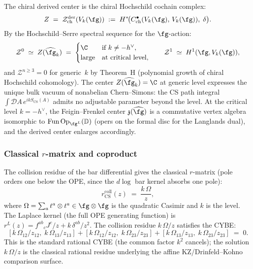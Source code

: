 The chiral derived center is the chiral Hochschild cochain
complex:
\begin{equation}\label{eq:cs-derived-center}
Z
\;=\;
\mathcal{Z}^{\mathrm{der}}_{\mathrm{ch}}(V_k(\fg))
\;:=\;
H^*\!\bigl(
 C^\bullet_{\mathrm{ch}}(V_k(\fg),\, V_k(\fg)),\;
 \delta
\bigr).
\end{equation}
By the Hochschild--Serre spectral sequence for the
$\fg$-action:
\begin{equation}\label{eq:cs-hochschild-computation}
\mathcal{Z}^0
\;\simeq\;
Z(\widehat{\fg}_k)
\;=\;
\begin{cases}
\C & \text{if } k \ne -h^\vee, \\
\text{large} & \text{at critical level},
\end{cases}
\qquad
\mathcal{Z}^1
\;\simeq\;
H^1(\fg, V_k(\fg)),
\end{equation}
and $\mathcal{Z}^{n \ge 3} = 0$ for generic~$k$ by Theorem~H (polynomial growth of chiral Hochschild cohomology). The center $Z(\widehat{\fg}_k) = \C$ at generic level expresses the unique bulk vacuum of nonabelian Chern--Simons: the CS path integral $\int \mathcal{D}A\, e^{ikS_{\mathrm{CS}}(A)}$ admits no adjustable parameter beyond the level. At the critical level $k = -h^\vee$, the Feigin--Frenkel center $\mathfrak{z}(\widehat{\fg})$ is a commutative vertex algebra isomorphic to $\operatorname{Fun}\operatorname{Op}_{\fg^L}(\mathbb{D})$ (opers on the formal disc for the Langlands dual), and the derived center enlarges accordingly.

\subsubsection*{Classical $r$-matrix and coproduct}

The collision residue of the bar differential gives the
classical $r$-matrix (pole orders one below the OPE, since the $d\log$ bar kernel absorbs one pole):
\begin{equation}\label{eq:cs-r-matrix}
r^{\mathrm{coll}}_{\mathrm{CS}}(z)
\;=\;
\frac{k\,\Omega}{z},
\end{equation}
where $\Omega = \sum_a t^a \otimes t^a \in \fg \otimes \fg$ is the
quadratic Casimir and $k$ is the level.
The Laplace kernel (the full OPE generating function) is
$r^L(z) = f^{ab}{}_c J^c/z + k\,\delta^{ab}/z^2$.
The collision residue $k\,\Omega/z$ satisfies the CYBE:
\begin{equation}\label{eq:cs-cybe}
[k\,\Omega_{12}/z_{12},\; k\,\Omega_{13}/z_{13}]
+ [k\,\Omega_{12}/z_{12},\; k\,\Omega_{23}/z_{23}]
+ [k\,\Omega_{13}/z_{13},\; k\,\Omega_{23}/z_{23}]
\;=\; 0.
\end{equation}
This is the standard rational CYBE (the common factor $k^2$ cancels); the solution $k\,\Omega/z$
is the classical rational residue underlying the affine
KZ/Drinfeld--Kohno comparison surface.

